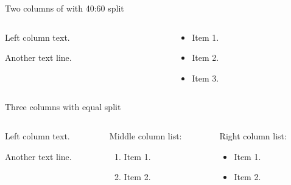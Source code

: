 \documentclass[
  12pt,
  ignorenonframetext,
  aspectratio=169,
  french,
  aspectratio=169]{beamer}
\providecommand{\tightlist}{%
  \setlength{\itemsep}{0pt}\setlength{\parskip}{0pt}}
\begin{document}
\begin{frame}{Two columns of with 40:60 split}
\label{two-columns-of-with-4060-split}
\begin{columns}[T]
\begin{column}{0.4\linewidth}
Left column text.

Another text line.
\end{column}

\begin{column}{0.6\linewidth}
\begin{itemize}
\tightlist
\item
  Item 1.
\item
  Item 2.
\item
  Item 3.
\end{itemize}
\end{column}
\end{columns}
\end{frame}

\begin{frame}{Three columns with equal split}
\label{three-columns-with-equal-split}
\begin{columns}[T]
\begin{column}{0.48\linewidth}
Left column text.

Another text line.
\end{column}

\begin{column}{0.48\linewidth}
Middle column list:

\begin{enumerate}
\tightlist
\item
  Item 1.
\item
  Item 2.
\end{enumerate}
\end{column}

\begin{column}{0.48\linewidth}
Right column list:

\begin{itemize}
\tightlist
\item
  Item 1.
\item
  Item 2.
\end{itemize}
\end{column}
\end{columns}
\end{frame}
\end{document}
